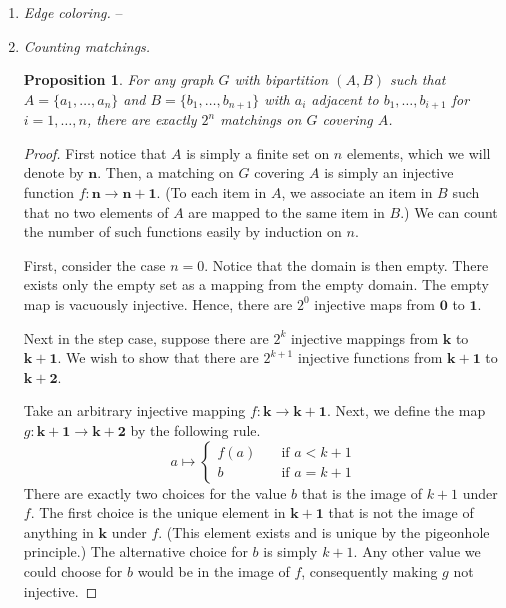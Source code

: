 \documentclass[letterpaper,11pt]{article}
\newtheorem{proposition}{Proposition}
\newcommand{\questionname}{\textit}
\newcommand{\fin}{\mathbf}
\begin{document}
\begin{enumerate}
    \item
        \questionname{Edge coloring.} --

    \item
        \questionname{Counting matchings.}

        \begin{proposition}
            For any graph $G$ with bipartition $(A, B)$ such that
            $A = \{a_1, \ldots, a_n\}$ and $B = \{b_1, \ldots, b_{n+1}\}$ with
            $a_i$ adjacent to $b_1, \ldots, b_{i+1}$ for $i = 1, \ldots, n$,
            there are exactly $2^n$ matchings on $G$ covering $A$.
        \end{proposition}

        \begin{proof}
            First notice that $A$ is simply a finite set on $n$ elements, which
            we will denote by $\fin{n}$. Then, a matching on $G$ covering $A$
            is simply an injective function $f : \fin{n} \to \fin{n+1}$. (To
            each item in $A$, we associate an item in $B$ such that no two
            elements of $A$ are mapped to the same item in $B$.) We can
            count the number of such functions easily by induction on $n$.

            First, consider the case $n = 0$. Notice that the domain is then
            empty.
            There exists only the empty set as a mapping from the empty domain.
            The empty map is vacuously injective.
            Hence, there are $2^0$ injective maps from $\fin{0}$ to $\fin{1}$.

            Next in the step case, suppose there are $2^k$ injective mappings
            from $\fin{k}$ to $\fin{k+1}$. We wish to show that there are
            $2^{k+1}$ injective functions from $\fin{k+1}$ to $\fin{k+2}$.

            Take an arbitrary injective mapping
            $f : \fin{k} \to \fin{k+1}$.
            Next, we define the map $g : \fin{k+1} \to \fin{k+2}$ by the
            following rule.
            \begin{equation*}
                a \mapsto \begin{cases}
                    f(a) &\quad\text{if } a < k + 1 \\
                    b    &\quad\text{if } a = k + 1
                \end{cases}
            \end{equation*}
            There are exactly two choices for the value $b$ that is the image
            of $k + 1$ under $f$. The first choice is the unique element in
            $\fin{k+1}$ that is not the image of anything in $\fin{k}$ under
            $f$. (This element exists and is unique by the pigeonhole
            principle.)
            The alternative choice for $b$ is simply $k+1$.
            Any other value we could choose for $b$ would be in the image of
            $f$, consequently making $g$ not injective.


\end{proof}
\end{enumerate}
\end{document}
